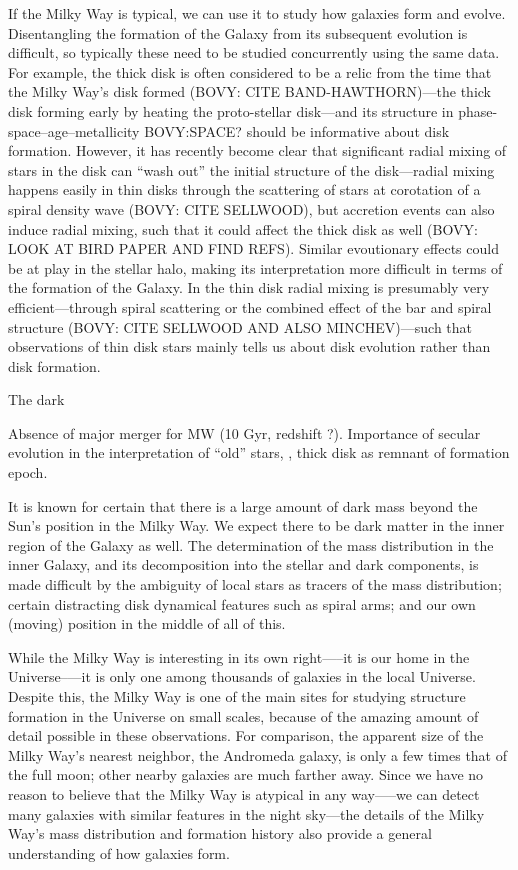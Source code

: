 If the Milky Way is typical, we can use it to study how galaxies form
and evolve. Disentangling the formation of the Galaxy from its
subsequent evolution is difficult, so typically these need to be
studied concurrently using the same data. For example, the thick disk
is often considered to be a relic from the time that the Milky Way's
disk formed (BOVY: CITE BAND-HAWTHORN)---the thick disk forming early
by heating the proto-stellar disk---and its structure in
phase-space--age--metallicity BOVY:SPACE? should be informative about
disk formation. However, it has recently become clear that significant
radial mixing of stars in the disk can ``wash out'' the initial
structure of the disk---radial mixing happens easily in thin disks
through the scattering of stars at corotation of a spiral density wave
(BOVY: CITE SELLWOOD), but accretion events can also induce radial
mixing, such that it could affect the thick disk as well (BOVY: LOOK
AT BIRD PAPER AND FIND REFS). Similar evoutionary effects could be at
play in the stellar halo, making its interpretation more difficult in
terms of the formation of the Galaxy. In the thin disk radial mixing
is presumably very efficient---through spiral scattering or the
combined effect of the bar and spiral structure (BOVY: CITE SELLWOOD
AND ALSO MINCHEV)---such that observations of thin disk stars mainly
tells us about disk evolution rather than disk formation.

The dark 



Absence of major merger for MW (10 Gyr, redshift ?). Importance of
secular evolution in the interpretation of ``old'' stars, \eg, thick
disk as remnant of formation epoch.


It is known for certain that there is a large amount of dark mass
beyond the Sun’s position in the Milky Way. We expect there to be dark
matter in the inner region of the Galaxy as well. The determination of
the mass distribution in the inner Galaxy, and its decomposition into
the stellar and dark components, is made difficult by the ambiguity of
local stars as tracers of the mass distribution; certain distracting
disk dynamical features such as spiral arms; and our own (moving)
position in the middle of all of this.

While the Milky Way is interesting in its own right—--it is our home
in the Universe--—it is only one among thousands of galaxies in the
local Universe. Despite this, the Milky Way is one of the main sites
for studying structure formation in the Universe on small scales,
because of the amazing amount of detail possible in these
observations. For comparison, the apparent size of the Milky Way’s
nearest neighbor, the Andromeda galaxy, is only a few times that of
the full moon; other nearby galaxies are much farther away. Since we
have no reason to believe that the Milky Way is atypical in any
way—--we can detect many galaxies with similar features in the night
sky—the details of the Milky Way’s mass distribution and formation
history also provide a general understanding of how galaxies form.


